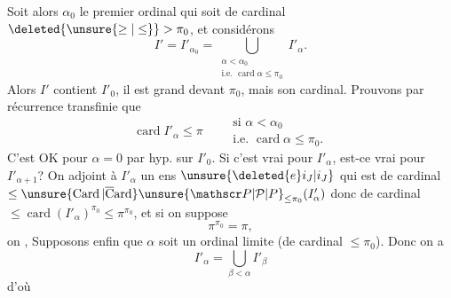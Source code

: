 Soit alors $\alpha_0$ le premier ordinal qui soit de cardinal $\deleted{\unsure{\geq|\leq}}>\pi_0$, et considérons 
\[
I'=I'_{\alpha_0}=\bigcup_{\substack{\alpha<\alpha_0\\\text{i.e. }\operatorname{card}\alpha\leq\pi_0}}I'_\alpha.
\]
Alors $I'$ contient $I'_0$, il est grand devant $\pi_0$, mais  son cardinal. Prouvons par récurrence transfinie que
\[
\operatorname{card}I'_\alpha\leq\pi\qquad
\begin{gathered}
\text{si }\alpha<\alpha_0\\
\text{i.e. }\operatorname{card}\alpha\leq\pi_0.
\end{gathered}
\]
C'est OK pour $\alpha=0$ par hyp. sur $I'_0$. Si c'est vrai pour $I'_\alpha$, est-ce vrai pour $I'_{\alpha+1}$? On  adjoint à $I'_\alpha$ un ens  $\unsure{\deleted{e}i_J|i_J}$ qui est de cardinal $\leq\unsure{\operatorname{Card}|\overline{\mathrm C}\mathrm{ard}}\unsure{\mathscr P|\mathcal P|P}_{\leq\pi_0}(I'_\alpha)$ donc de cardinal $\leq\operatorname{card}(I'_\alpha)^{\pi_0}\leq\pi^{\pi_0}$, et si on suppose
\[
\pi^{\pi_0}=\pi,
\]
on ,  Supposons enfin que $\alpha$ soit un ordinal limite (de cardinal $\leq\pi_0$). Donc on a
\[
I'_\alpha=\bigcup_{\beta<\alpha}I'_\beta
\]
d'où 
